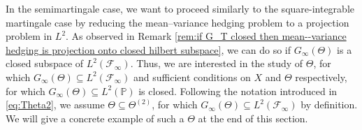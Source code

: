 \documentclass[11pt,a4paper,twoside,openany]{report}
\numberwithin{equation}{section}
\theoremstyle{plain} %
\theoremstyle{definition} %
\theoremstyle{remark} %
\begin{document}
In the semimartingale case, we want to proceed similarly to the square-integrable martingale case by reducing the mean--variance hedging problem to a projection problem in \(L^2\). As observed in Remark \ref{rem:if G_T closed then mean--variance hedging is projection onto closed hilbert subspace}, we can do so if \(G_{\infty}(\Theta)\) is a closed subspace of  \(L^2(\mathcal{F}_{\infty})\). Thus, we are interested in the study of \(\Theta\), for which \(G_{\infty}(\Theta)\subseteq L^2(\mathcal{F}_{\infty})\) and sufficient conditions on \(X\) and \(\Theta\) respectively, for which \(G_{\infty}(\Theta)\subseteq L^2(\mathbb{P})\) is closed. Following the notation introduced in \eqref{eq:Theta2}, we assume \(\Theta\subseteq\Theta^{(2)}\), for which \(G_{\infty}(\Theta)\subseteq L^2(\mathcal{F}_{\infty})\) by definition. We will give a concrete example of such a \(\Theta\) at the end of this section.
\end{document}
